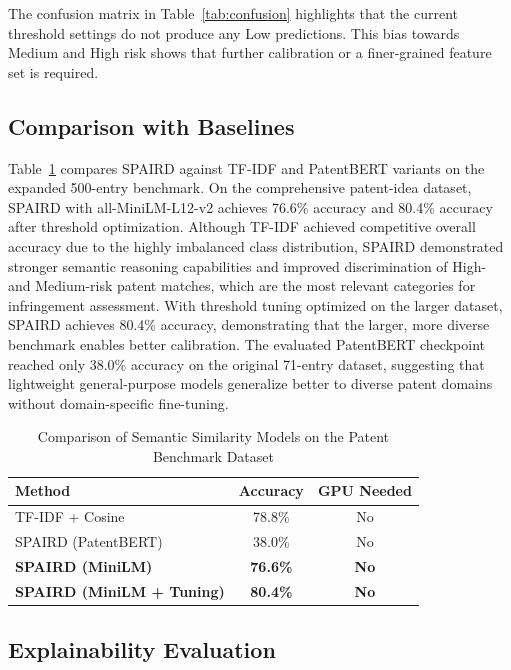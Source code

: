 \documentclass[conference]{IEEEtran}
\begin{document}
The confusion matrix in Table~\ref{tab:confusion} highlights that the
current threshold settings do not produce any Low predictions. This bias
towards Medium and High risk shows that further calibration or a finer-grained
feature set is required.

\subsection{Comparison with Baselines}

Table~\ref{tab:cmp} compares SPAIRD against TF-IDF and PatentBERT variants on the expanded 500-entry benchmark.
On the comprehensive patent-idea dataset, SPAIRD with all-MiniLM-L12-v2 achieves 76.6\% accuracy and 80.4\% accuracy after threshold optimization. Although TF-IDF achieved competitive overall accuracy due to the highly imbalanced class distribution, SPAIRD demonstrated stronger semantic reasoning capabilities and improved discrimination of High- and Medium-risk patent matches, which are the most relevant categories for infringement assessment.
With threshold tuning optimized on the larger dataset, SPAIRD achieves 80.4\% accuracy, demonstrating that the larger, more diverse benchmark enables better calibration.
The evaluated PatentBERT checkpoint reached only 38.0\% accuracy on the original 71-entry dataset, suggesting that lightweight general-purpose models generalize better to diverse patent domains without domain-specific fine-tuning.

\begin{table}[htbp]
\caption{Comparison of Semantic Similarity Models on the Patent Benchmark Dataset}
\label{tab:cmp}
\centering
\renewcommand{\arraystretch}{1.15}
\begin{tabular}{|l|c|c|}
\hline
\textbf{Method} & \textbf{Accuracy} & \textbf{GPU Needed}\\
\hline
TF-IDF + Cosine & 78.8\% & No\\
SPAIRD (PatentBERT) & 38.0\% & No\\
\textbf{SPAIRD (MiniLM)} & \textbf{76.6\%} & \textbf{No}\\
\textbf{SPAIRD (MiniLM + Tuning)} & \textbf{80.4\%} & \textbf{No}\\
\hline
\end{tabular}
\end{table}

\subsection{Explainability Evaluation}
\end{document}
